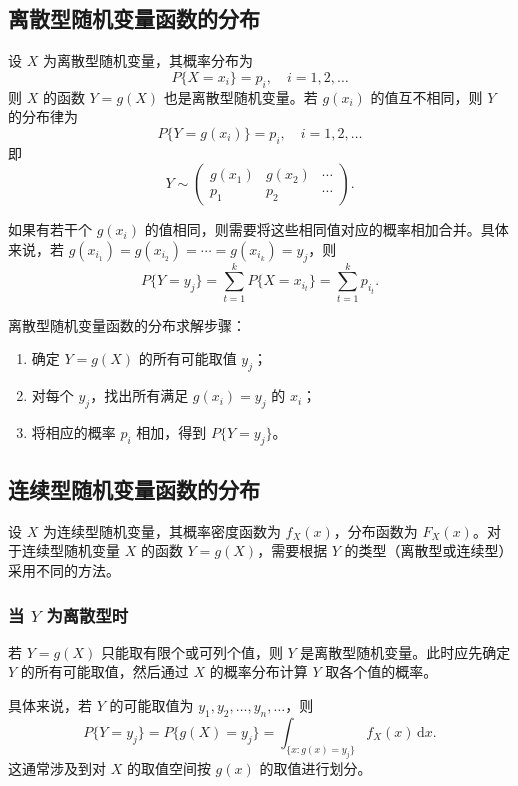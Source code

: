 ﻿\documentclass[lang=cn,11pt]{elegantbook}
\begin{document}
\subsection{离散型随机变量函数的分布} \label{subsec:discrete-to-discrete}

设 $X$ 为离散型随机变量，其概率分布为
\[
P\{X = x_i\} = p_i,\quad i=1,2,\dots
\]
则 $X$ 的函数 $Y = g(X)$ 也是离散型随机变量。若 $g(x_i)$ 的值互不相同，则 $Y$ 的分布律为
\[
P\{Y = g(x_i)\} = p_i,\quad i=1,2,\dots
\]
即
\[
Y \sim \begin{pmatrix} g(x_1) & g(x_2) & \cdots \\ p_1 & p_2 & \cdots \end{pmatrix}.
\]

如果有若干个 $g(x_i)$ 的值相同，则需要将这些相同值对应的概率相加合并。具体来说，若 $g(x_{i_1}) = g(x_{i_2}) = \cdots = g(x_{i_k}) = y_j$，则
\[
P\{Y = y_j\} = \sum_{t=1}^{k} P\{X = x_{i_t}\} = \sum_{t=1}^{k} p_{i_t}.
\]

\begin{property}\label{prop:discrete-function}
离散型随机变量函数的分布求解步骤：
\begin{enumerate}
    \item 确定 $Y = g(X)$ 的所有可能取值 $y_j$；
    \item 对每个 $y_j$，找出所有满足 $g(x_i) = y_j$ 的 $x_i$；
    \item 将相应的概率 $p_i$ 相加，得到 $P\{Y = y_j\}$。
\end{enumerate}
\end{property}

\subsection{连续型随机变量函数的分布} \label{subsec:continuous-function}

设 $X$ 为连续型随机变量，其概率密度函数为 $f_X(x)$，分布函数为 $F_X(x)$。对于连续型随机变量 $X$ 的函数 $Y = g(X)$，需要根据 $Y$ 的类型（离散型或连续型）采用不同的方法。

\subsubsection{当 \texorpdfstring{$Y$}{Y} 为离散型时}

若 $Y = g(X)$ 只能取有限个或可列个值，则 $Y$ 是离散型随机变量。此时应先确定 $Y$ 的所有可能取值，然后通过 $X$ 的概率分布计算 $Y$ 取各个值的概率。

具体来说，若 $Y$ 的可能取值为 $y_1, y_2, \dots, y_n, \dots$，则
\[
P\{Y = y_j\} = P\{g(X) = y_j\} = \int_{\{x: g(x) = y_j\}} f_X(x) \,\mathrm{d}x.
\]
这通常涉及到对 $X$ 的取值空间按 $g(x)$ 的取值进行划分。
\end{document}
